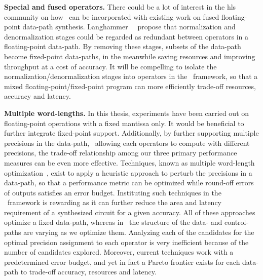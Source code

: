 \textbf{Special and fused operators.} There could be a lot of interest in the
\gls{hls} community on how \soap~can be incorporated with existing work on
fused floating-point data-path synthesis.  Langhammer~\etal~\cite{langhammer}
propose that normalization and denormalization stages could be regarded as
redundant between operators in a floating-point data-path.  By removing
these stages, subsets of the data-path become fixed-point data-paths, in the
meanwhile saving resources and improving throughput at a cost of accuracy.  It
will be compelling to isolate the normalization/denormalization stages into
operators in the \soap~framework, so that a mixed floating-point/fixed-point
program can more efficiently trade-off resources, accuracy and latency.

\textbf{Multiple word-lengths.}  In this thesis, experiments have been carried
out on floating-point operations with a fixed mantissa only.  It would be
beneficial to further integrate fixed-point support.  Additionally, by further
supporting multiple precisions in the data-path, \ie~allowing each operators to
compute with different precisions, the trade-off relationship among our three
primary performance measures can be even more effective.  Techniques, known
as multiple word-length optimization~\cite{constantinides, lee06, cantin02},
exist to apply a heuristic approach to perturb the precisions in a data-path,
so that a performance metric can be optimized while round-off errors of outputs
satisfies an error budget.  Instituting such techniques in the \soap~framework
is rewarding as it can further reduce the area and latency requirement of a
synthesized circuit for a given accuracy.  All of these approaches optimize a
fixed data-path, whereas in \soap~the structure of the data- and control-paths
are varying as we optimize them.  Analyzing each of the candidates for the
optimal precision assignment to each operator is very inefficient because of
the number of candidates explored.  Moreover, current techniques work with a
predetermined error budget, and yet in fact a Pareto frontier exists for each
data-path to trade-off accuracy, resources and latency.

